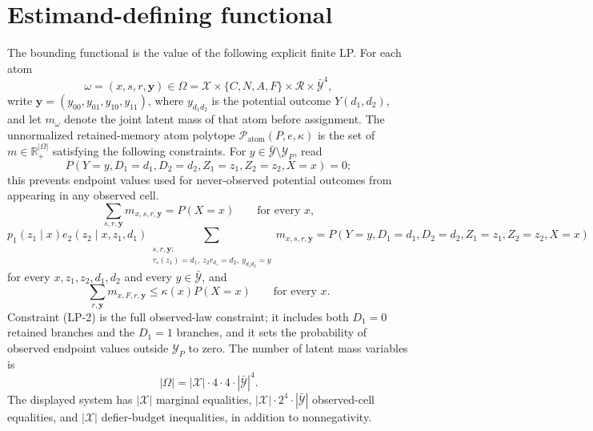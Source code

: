 \documentclass[11pt]{article}
\theoremstyle{definition}
\theoremstyle{plain}
\theoremstyle{remark}
\begin{document}
\section{Estimand-defining functional}\label{sec:estimand-functional}
The bounding functional is the value of the following explicit finite LP.
For each atom
\[
\omega=(x,s,r,\mathbf y)\in
\Omega=\mathcal X\times\{C,N,A,F\}\times\mathcal R\times\bar{\mathcal Y}^{4},
\]
write \(\mathbf y=(y_{00},y_{01},y_{10},y_{11})\), where \(y_{d_1d_2}\) is the potential outcome \(Y(d_1,d_2)\), and let \(m_\omega\) denote the joint latent mass of that atom before assignment.
The unnormalized retained-memory atom polytope \(\mathcal P_{\mathrm{atom}}(P,e,\kappa)\) is the set of \(m\in\mathbb R_+^{|\Omega|}\) satisfying the following constraints.
For \(y\in\bar{\mathcal Y}\setminus\mathcal Y_P\), read
\[
P(Y=y,D_1=d_1,D_2=d_2,Z_1=z_1,Z_2=z_2,X=x)=0;
\]
this prevents endpoint values used for never-observed potential outcomes from appearing in any observed cell.
\begin{equation}
\sum_{s,r,\mathbf y}m_{x,s,r,\mathbf y}=P(X=x)\qquad\text{for every }x,
\tag{LP-1}
\end{equation}
\begin{equation}
p_1(z_1\mid x)e_2(z_2\mid x,z_1,d_1)
\sum_{\substack{s,r,\mathbf y:\\
\tau_s(z_1)=d_1,\ z_2 r_{d_1}=d_2,\ y_{d_1d_2}=y}}
m_{x,s,r,\mathbf y}
=P(Y=y,D_1=d_1,D_2=d_2,Z_1=z_1,Z_2=z_2,X=x)
\tag{LP-2}
\end{equation}
for every \(x,z_1,z_2,d_1,d_2\) and every \(y\in\bar{\mathcal Y}\), and
\begin{equation}
\sum_{r,\mathbf y}m_{x,F,r,\mathbf y}
\le \kappa(x)P(X=x)\qquad\text{for every }x.
\tag{LP-3}
\end{equation}
Constraint (LP-2) is the full observed-law constraint; it includes both \(D_1=0\) retained branches and the \(D_1=1\) branches, and it sets the probability of observed endpoint values outside \(\mathcal Y_P\) to zero.
The number of latent mass variables is
\[
|\Omega|=|\mathcal X|\cdot4\cdot4\cdot|\bar{\mathcal Y}|^4.
\]
The displayed system has \( |\mathcal X|\) marginal equalities, \( |\mathcal X|\cdot2^4\cdot|\bar{\mathcal Y}|\) observed-cell equalities, and \( |\mathcal X|\) defier-budget inequalities, in addition to nonnegativity.
\end{document}
